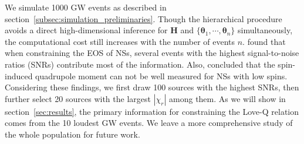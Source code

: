 \documentclass[a4paper,11pt]{article}
\begin{document}
We simulate 1000 GW events as 
described in section~\ref{subsec:simulation_preliminaries}. 
Though the hierarchical procedure avoids a direct high-dimensional inference for
$\bm{H}$ and $\{\bm{\theta}_1,\cdots,\bm{\theta}_n\}$ simultaneously, the
computational cost still increases with the number of events $n$.
\citet{Lackey:2014fwa} found that when constraining the EOS of NSs, several events
with the highest signal-to-noise ratios (SNRs)
 contribute most of the information. Also,
\citet{Yagi:2013awa} concluded that the spin-induced quadrupole moment can not
be well measured for NSs with low spins. Considering these findings, we first
draw 100 sources with the highest SNRs, then further select 20 sources with the
largest $|\chi_{r}|$ among them. As we will show in section~\ref{sec:results}, the primary
information for constraining the Love-Q relation comes from the 10 loudest GW
events. We leave a more comprehensive study of the whole population for future
work. 
\end{document}
